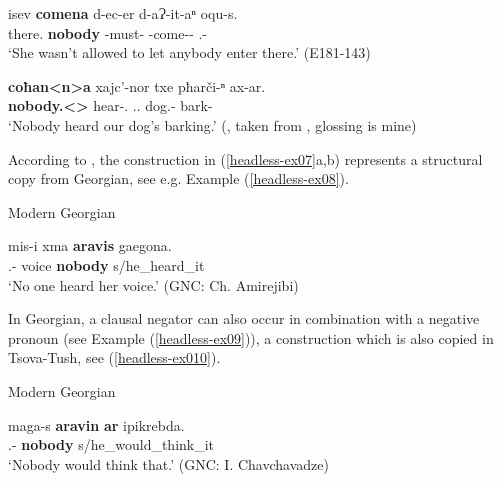 \begin{exe}
	\ex\label{headless-ex07}
	\begin{xlist}
		
		\ex\label{headless-ex07a}
		\gll isev \textbf{comena} d-ec-er d-aɁ-it-aⁿ oqu-s. \\
		there.{\Lat} \textbf{nobody} {\D}-must-{\Imprf} {\D}-come-{\Caus}-{\Inf} {\Dist}.{\Obl}-{\Erg} \\
		\trans `She wasn't allowed to let anybody enter there.'
		\hfill (E181-143)
		
		\ex\label{headless-ex07b}
		\gll \textbf{coħan<n>a} xajc’-nor txe pħarči-ⁿ ax-ar. \\
		\textbf{nobody.{\Obl}<{\Dat}>} hear-{\Nw}.{\Rem} {\Fpl}.{\Gen}.{\Obl} dog.{\Pl}-{\Gen} bark-{\Vn} \\
		\trans `Nobody heard our dog’s barking.’
		\hfill (\cite[202]{mikeladze11}, taken from \textcite{ankernegation}, glossing is mine)
	\end{xlist}
\end{exe}


According to \textcite[202]{mikeladze11}, the construction in (\ref{headless-ex07}a,b) represents a structural copy from Georgian, see e.g. Example (\ref{headless-ex08}).

\begin{exe}
	\ex\label{headless-ex08}
	Modern Georgian
    
	\gll mis-i xma \textbf{aravis} gaegona. \\
	{\Tsg}.{\Poss}-{\Agr} voice \textbf{nobody} s/he\_heard\_it \\
	\trans `No one heard her voice.'
	\hfill (GNC: Ch. Amirejibi)
\end{exe}

In Georgian, a clausal negator can also occur in combination with a negative pronoun (see Example (\ref{headless-ex09})), a construction which is also copied in Tsova-Tush, see (\ref{headless-ex010}).

\begin{exe}
	\ex\label{headless-ex09}
	Modern Georgian 
    
	\gll  maga-s \textbf{aravin} \textbf{ar} ipikrebda. \\
	{\Med}.{\Obl}-{\Dat} \textbf{nobody} \textbf{{\Neg}} s/he\_would\_think\_it\\
	\trans `Nobody would think that.'
	\hfill (GNC: I. Chavchavadze)
\end{exe}


